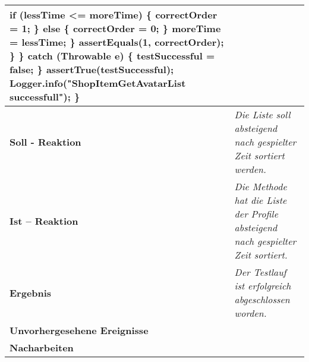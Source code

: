 \begin{longtable}{|p{4cm}|p{11cm}|}
{\hspace*{12mm}                if (lessTime <= moreTime) \{ \newline
\hspace*{15mm}                    correctOrder = 1; \newline
\hspace*{12mm}                \} else \{ \newline
\hspace*{15mm}                    correctOrder = 0; \newline
\hspace*{12mm}                \} \newline
\hspace*{12mm}                moreTime = lessTime; \newline
\hspace*{9mm}            \} \newline
\hspace*{9mm}            assertEquals(1, correctOrder); \newline
\hspace*{6mm}        \} \newline
\hspace*{3mm}    \} catch (Throwable e) \{ \newline
\hspace*{6mm}        testSuccessful = false; \newline
\hspace*{3mm}    \} \newline
\hspace*{3mm}    assertTrue(testSuccessful); \newline
\hspace*{3mm}    Logger.info("ShopItemGetAvatarList successfull"); \newline
\} \newline
} \\
\hline
\textbf{Soll - Reaktion} & \textit{Die Liste soll absteigend nach gespielter Zeit sortiert werden.} \\
\hline
\textbf{Ist -- Reaktion} & \textit{Die Methode hat die Liste der Profile absteigend nach gespielter Zeit sortiert.} \\
\hline
\textbf{Ergebnis} & \textit{Der Testlauf ist erfolgreich abgeschlossen worden.} \\
\hline
\textbf{Unvorhergesehene Ereignisse} &
\textit{} \\
\hline
\textbf{Nacharbeiten } & \textit{} \\
\hline
\end{longtable}

